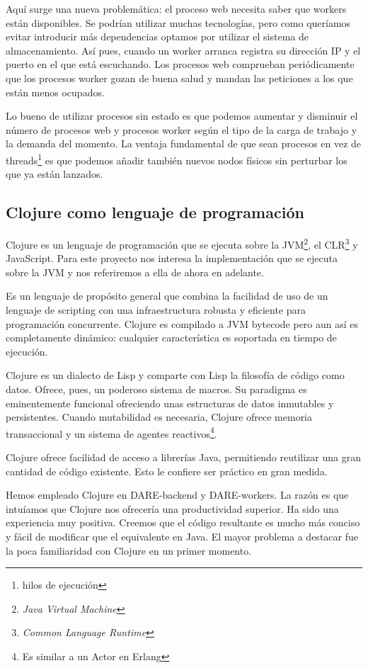 Aquí surge una nueva problemática: el proceso web necesita saber que
workers están disponibles. Se podrían utilizar muchas tecnologías,
pero como queríamos evitar introducir más dependencias optamos por
utilizar el sistema de almacenamiento. Así pues, cuando un worker
arranca registra su dirección IP y el puerto en el que está
escuchando. Los procesos web comprueban periódicamente que los
procesos worker gozan de buena salud y mandan las peticiones a los que
están menos ocupados.

Lo bueno de utilizar procesos sin estado es que podemos aumentar y
disminuir el número de procesos web y procesos worker según el tipo de
la carga de trabajo y la demanda del momento. La ventaja fundamental
de que sean procesos en vez de threads\footnote{hilos de ejecución} es
que podemos añadir también nuevos nodos físicos sin perturbar los que
ya están lanzados.

\subsection{Clojure como lenguaje de programación}

Clojure es un lenguaje de programación que se ejecuta sobre la
JVM\footnote{\emph{Java Virtual Machine}}, el
CLR\cite{CLR}\footnote{\emph{Common Language Runtime}} y
JavaScript. Para este proyecto nos interesa la implementación que se
ejecuta sobre la JVM y nos referiremos a ella de ahora en adelante.

Es un lenguaje de propósito general que combina la facilidad de uso de
un lenguaje de scripting con una infraestructura robusta y eficiente
para programación concurrente. Clojure es compilado a JVM bytecode
pero aun así es completamente dinámico: cualquier característica es
soportada en tiempo de ejecución.

Clojure es un dialecto de Lisp\cite{LISP} y comparte con Lisp la
filosofía de código como datos. Ofrece, pues, un poderoso sistema de
macros. Su paradigma es eminentemente funcional ofreciendo unas
estructuras de datos inmutables y
persistentes\cite{PERSISTENT-DATA-STRUCTURES}. Cuando mutabilidad es
necesaria, Clojure ofrece memoria transaccional y un sistema de
agentes reactivos\footnote{Es similar a un Actor en Erlang}.

Clojure ofrece facilidad de acceso a librerías Java, permitiendo
reutilizar una gran cantidad de código existente. Esto le confiere ser
práctico en gran medida.

Hemos empleado Clojure en DARE-backend y DARE-workers. La razón es que
intuíamos que Clojure nos ofrecería una productividad superior. Ha
sido una experiencia muy positiva. Creemos que el código resultante es
mucho más conciso y fácil de modificar que el equivalente en Java. El
mayor problema a destacar fue la poca familiaridad con Clojure en un
primer momento.

